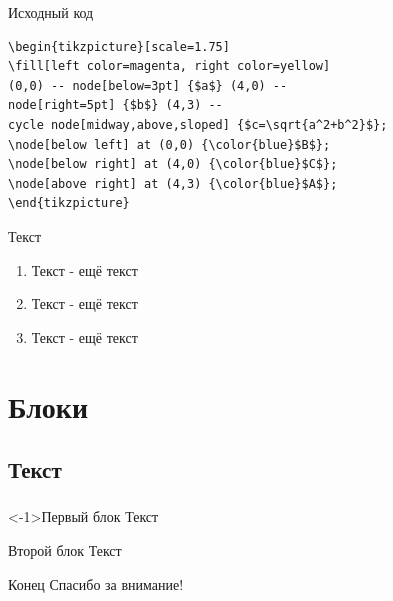 \documentclass{beamer}
\begin{document}
\begin{frame}[fragile]{Исходный код}
\begin{adjustbox}{scale=0.8}
\begin{large}


 \begin{lstlisting}[language=Tex]
  \begin{tikzpicture}[scale=1.75]
\fill[left color=magenta, right color=yellow]
(0,0) -- node[below=3pt] {$a$} (4,0) --
node[right=5pt] {$b$} (4,3) --
cycle node[midway,above,sloped] {$c=\sqrt{a^2+b^2}$};
\node[below left] at (0,0) {\color{blue}$B$};
\node[below right] at (4,0) {\color{blue}$C$};
\node[above right] at (4,3) {\color{blue}$A$};
\end{tikzpicture}

\end{lstlisting}
\end{large}
\end{adjustbox}
\end{frame}


















\begin{frame} {Текст}
       \begin{enumerate}
       
       
       \item Текст - ещё текст
       \item Текст - ещё текст
       \item Текст - ещё текст
       \end{enumerate}
       
       
       
       
\end{frame}



\section{Блоки}
\subsection{Текст}
\begin{frame}
	\frametitle{\insertsection}
	\framesubtitle{\insertsubsection}
	\begin{block}<-1>{Первый блок}
		Текст
	\end{block}
	\begin{block}{Второй блок}
		Текст
	\end{block}
	
\end{frame}










\begin{frame}{Конец}
\centering
\huge
Спасибо за внимание!

\end{frame}
\end{document}
